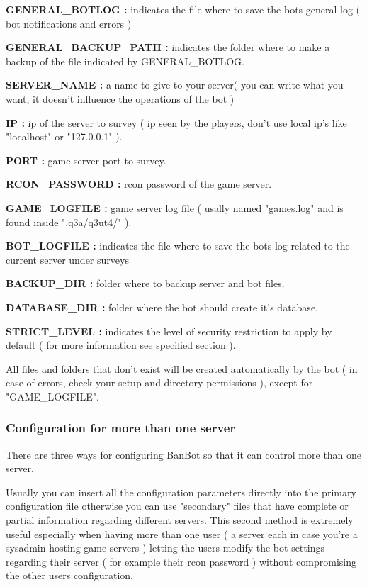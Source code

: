 \documentclass[a4paper]{article}
\begin{document}
\begin{description}
\item{\textbf{GENERAL\_BOTLOG :}} indicates the file where to save the bots general log ( bot notifications and errors )
\item{\textbf{GENERAL\_BACKUP\_PATH :}} indicates the folder where to make a backup of the file indicated by GENERAL\_BOTLOG.
\item{\textbf{SERVER\_NAME :}} a name to give to your server( you can write what you want, it doesn't influence the operations of the bot )
\item{\textbf{IP :}} ip of the server to survey ( ip seen by the players, don't use local ip's like "localhost" or "127.0.0.1" ).
\item{\textbf{PORT :}} game server port to survey.
\item{\textbf{RCON\_PASSWORD :}}  rcon password of the game server.
\item{\textbf{GAME\_LOGFILE :}} game server log file ( usally named "games.log" and is found inside ".q3a/q3ut4/" ).
\item{\textbf{BOT\_LOGFILE :}} indicates the file where to save the bots log related to the current server under surveys
\item{\textbf{BACKUP\_DIR :}} folder where to backup server and bot files.
\item{\textbf{DATABASE\_DIR :}} folder where the bot should create it's database.
\item{\textbf{STRICT\_LEVEL :}} indicates the level of security restriction to apply by default ( for more information see specified section ).
\end{description}

All files and folders that don't exist will be created automatically by the bot ( in case of errors, check your setup and directory permissions ), except for "GAME\_LOGFILE".

\subsubsection {Configuration for more than one server}
There are three ways for configuring BanBot so that it can control more than one server.

Usually you can insert all the configuration parameters directly into the primary configuration file otherwise you can use "secondary" files that
have complete or partial information regarding different servers.
This second method is extremely  useful especially when having more than one user ( a server each in case you're a sysadmin hosting game servers ) letting the users
modify the bot settings regarding their server ( for example their rcon password ) without compromising the other users configuration. \\
\end{document}
